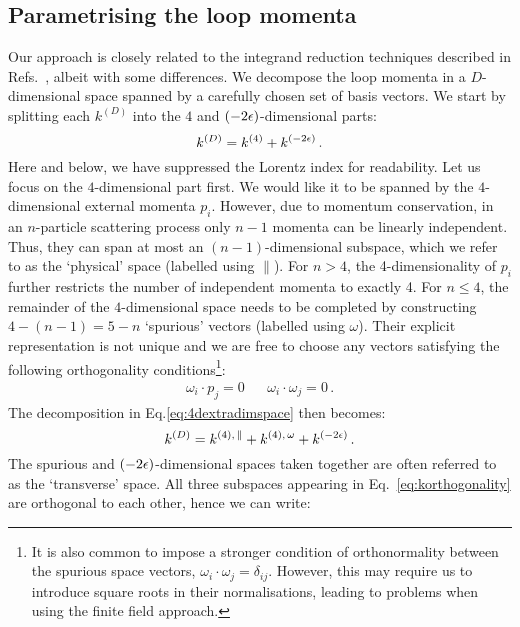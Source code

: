 \documentclass[main.tex]{subfiles}
\begin{document}
\subsection{Parametrising the loop momenta}
Our approach is closely related to the integrand reduction techniques described in Refs.~\cite{Ellis:2011cr, Mastrolia:2016dhn, Peraro:2016wsq, badger:2017jhb, Badger:2023eqz}, albeit with some differences. We decompose the loop momenta in a $D$-dimensional space spanned by a carefully chosen set of basis vectors. We start by splitting each $k^{(D)}$ into the $4$ and $(-2\epsilon)$-dimensional parts:
\begin{equation} \label{eq:4dextradimspace}
    k^{(D)} = k^{(4)} + k^{(-2\epsilon)}\,.
\end{equation}
Here and below, we have suppressed the Lorentz index for readability. Let us focus on the $4$-dimensional part first. We would like it to be spanned by the $4$-dimensional external momenta $p_i$. However, due to momentum conservation, in an $n$-particle scattering process only $n-1$ momenta can be linearly independent. Thus, they can span at most an $(n-1)$-dimensional subspace, which we refer to as the `physical' space (labelled using $\parallel$). For $n>4$, the 4-dimensionality of $p_i$ further restricts the number of independent momenta to exactly 4. For $n\le4$, the remainder of the $4$-dimensional space needs to be completed by constructing $4-(n-1) = 5-n$ `spurious' vectors (labelled using $\omega$). Their explicit representation is not unique and we are free to choose any vectors satisfying the following orthogonality conditions\footnote{It is also common to impose a stronger condition of orthonormality between the spurious space vectors, $\omega_i \cdot \omega_j = \delta_{ij}$. However, this may require us to introduce square roots in their normalisations, leading to problems when using the finite field approach.}:
\begin{align} \label{eq:orthogonalityconditions}
    \omega_i \cdot p_j = 0 && \omega_i \cdot \omega_j = 0\,.
\end{align}
The decomposition in Eq.\ref{eq:4dextradimspace} then becomes:
\begin{equation} \label{eq:korthogonality}
    k^{(D)} = k^{(4),\, \parallel} + k^{(4),\, \omega} + k^{(-2\epsilon)}\,.
\end{equation}
The spurious and $(-2\epsilon)$-dimensional spaces taken together are often referred to as the `transverse' space. All three subspaces appearing in Eq.~\ref{eq:korthogonality} are orthogonal to each other, hence we can write:
\end{document}

